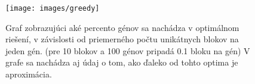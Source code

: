 \begin{figure}[h]
 \centering
\texttt{[image: images/greedy]}
\caption{Graf zobrazujúci aké percento génov sa nachádza v optimálnom riešení, v závislosti od priemerného počtu unikátnych blokov na jeden gén. (pre 10 blokov a 100 génov pripadá 0.1 bloku na gén)
V grafe sa nachádza aj údaj o tom, ako ďaleko od tohto optima je aproximácia.}\label{obr:greedy}
\end{figure}
